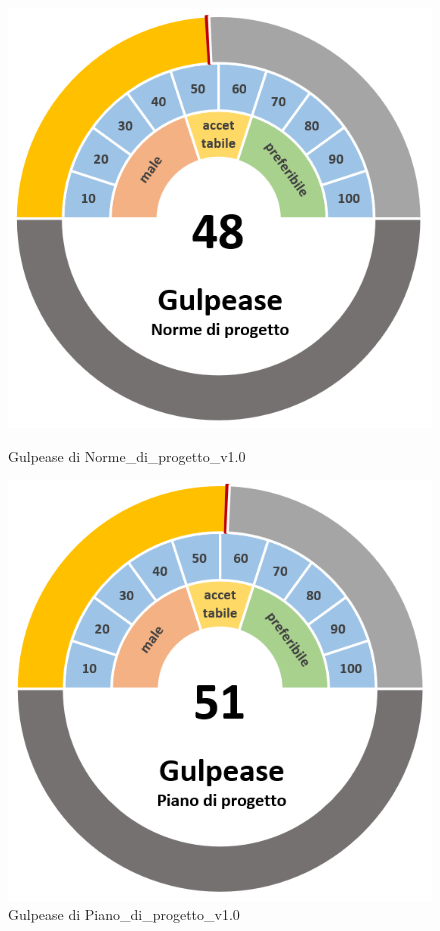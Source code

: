 \begin{figure}[H]
    \centering
    \begin{minipage}[b]{0.45\textwidth}
        \centering
        \includegraphics[width=\textwidth]{GulpeaseNdp.png}
        \caption{Gulpease di Norme\_di\_progetto\_v1.0}
    \end{minipage}
    \hfill
    \begin{minipage}[b]{0.45\textwidth}
        \centering
        \includegraphics[width=\textwidth]{GulpeasePdp.png}
        \caption{Gulpease di Piano\_di\_progetto\_v1.0}
    \end{minipage}
\end{figure}
